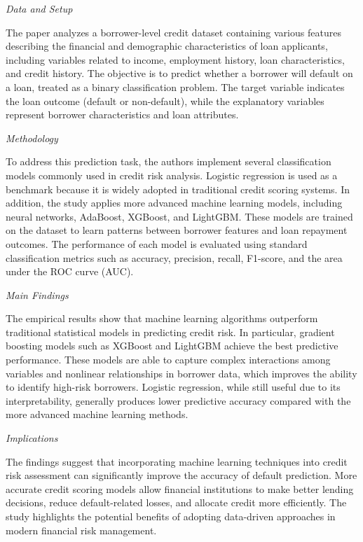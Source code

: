 \documentclass[letterpaper]{article}
\begin{document}
		\medskip
		
		\textit{Data and Setup}
		
		The paper analyzes a borrower-level credit dataset containing various features describing the financial and demographic characteristics of loan applicants, including variables related to income, employment history, loan characteristics, and credit history. The objective is to predict whether a borrower will default on a loan, treated as a binary classification problem. The target variable indicates the loan outcome (default or non-default), while the explanatory variables represent borrower characteristics and loan attributes.
		
		\medskip
		
		\textit{Methodology}
		
		To address this prediction task, the authors implement several classification models commonly used in credit risk analysis. Logistic regression is used as a benchmark because it is widely adopted in traditional credit scoring systems. In addition, the study applies more advanced machine learning models, including neural networks, AdaBoost, XGBoost, and LightGBM. These models are trained on the dataset to learn patterns between borrower features and loan repayment outcomes. The performance of each model is evaluated using standard classification metrics such as accuracy, precision, recall, F1-score, and the area under the ROC curve (AUC).
		
		\medskip
		
		\textit{Main Findings}
		
		The empirical results show that machine learning algorithms outperform traditional statistical models in predicting credit risk. In particular, gradient boosting models such as XGBoost and LightGBM achieve the best predictive performance. These models are able to capture complex interactions among variables and nonlinear relationships in borrower data, which improves the ability to identify high-risk borrowers. Logistic regression, while still useful due to its interpretability, generally produces lower predictive accuracy compared with the more advanced machine learning methods.
		
		\medskip
		
		\textit{Implications}
		
		The findings suggest that incorporating machine learning techniques into credit risk assessment can significantly improve the accuracy of default prediction. More accurate credit scoring models allow financial institutions to make better lending decisions, reduce default-related losses, and allocate credit more efficiently. The study highlights the potential benefits of adopting data-driven approaches in modern financial risk management.
		
\end{document}
